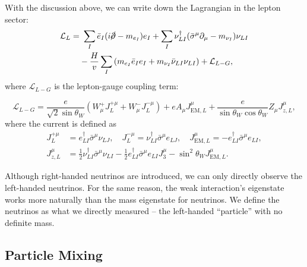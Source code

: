 \documentclass[aps,rmp,twocolumn,superscriptaddress,nofootinbib]{revtex4-2}
\begin{document}
With the discussion above, we can write down the Lagrangian in the lepton sector:
\begin{equation*}
\begin{aligned}
	\mathcal L_L =&\ \sum_I \bar e_I (i\cancel\partial-m_{e_I})e_I + \sum_I \nu_{LI}^\dagger (\bar\sigma^\mu \partial_\mu -m_{\nu_I})\nu_{LI} \\
	& -\frac{H}{v} \sum_I \left(m_{e_I} \bar e_I e_I + m_{\nu_I}\bar\nu_{LI}\nu_{LI}\right)+ \mathcal L_{L-G},
\end{aligned}
\end{equation*}
where $\mathcal L_{L-G}$ is the lepton-gauge coupling term:
\begin{widetext}
\begin{equation}
	\mathcal L_{L-G} = \frac{e}{\sqrt{2}\sin{\theta_W}}\left(W^{+}_\mu J_L^{+\mu} + W^{-}_\mu J_L^{-\mu} \right) + e A_\mu J^{\mu}_{\mathrm{EM},L} + \frac{e}{\sin{\theta_W}\cos{\theta_W}} Z_\mu J^\mu_{z,L},
\end{equation}
where the current is defined as 
\begin{equation*}
\begin{aligned}
	J^{+\mu}_L &= e_{LI}^\dagger \bar\sigma^\mu \nu_{LJ}, \quad
	J^{-\mu}_L = \nu_{LI}^\dagger \bar\sigma^\mu e_{LJ}, \quad
	J^\mu_{\mathrm{EM},L} = - e_{LI}^\dagger \bar\sigma^\mu e_{LI}, \\
	J_{z,L}^\mu &= \frac{1}{2} \nu_{LI}^\dagger \bar\sigma^\mu \nu_{LI} - \frac{1}{2} e_{LI}^\dagger \bar\sigma^\mu e_{LI} J^\mu_3-\sin^2{\theta_W}J_{\mathrm{EM},L}^\mu.
\end{aligned}
\end{equation*}
\end{widetext}
Although right-handed neutrinos are introduced, we can only directly observe the left-handed neutrinos.
For the same reason, the weak interaction's eigenstate works more naturally than the mass eigenstate for neutrinos. 
We define the neutrinos as what we directly measured -- the left-handed ``particle'' with no definite mass.



\subsection{Particle Mixing}
\end{document}
